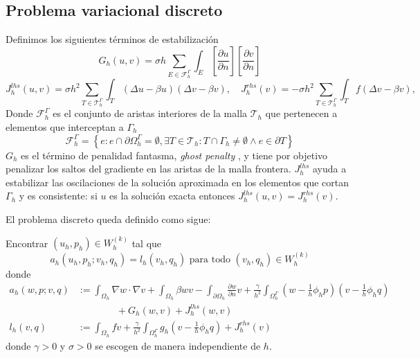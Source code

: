 \subsection{Problema variacional discreto}
Definimos los siguientes términos de estabilización
\begin{equation}
	G_h(u,v)= \sigma h \sum_{E\in \mathcal{F}_h^\Gamma} \int_E \left[ \frac{\partial u}{\partial n} \right]
	\left[ \frac{\partial v}{\partial n} \right]	
\end{equation}
\begin{equation}
	J_h^{lhs}(u,v)=\sigma h^2 \sum_{T\in \mathcal{T}_h^\Gamma} \int_T (\Delta u-\beta u) (\Delta  v-\beta v),\quad
	J_h^{rhs}(v)=-\sigma h^2 \sum_{T\in \mathcal{T}_h^\Gamma} \int_T f(\Delta  v-\beta v),\quad 
\end{equation}
Donde $\mathcal{F}_h^\Gamma$ es el conjunto de aristas interiores de la malla $\mathcal{T}_h$ que pertenecen a elementos que interceptan a $\Gamma_h$
\[
\mathcal{F}_h^\Gamma  = \left\{ e : e\cap \partial\Omega^\Gamma_h =\emptyset,  \exists T\in \mathcal{T}_h: T\cap \Gamma_h \neq \emptyset \wedge e\in \partial T \right\}
\]
$G_h$ es el término de penalidad fantasma, \textit{ghost penalty} \citep{burman2010ghost}, y tiene por objetivo penalizar los saltos del gradiente en las aristas de la malla frontera. $J_h^{lhs}$ ayuda a estabilizar las oscilaciones de la solución aproximada en los elementos que cortan $\Gamma_h$ y es consistente: si $u$ es la solución exacta entonces $J_h^{lhs}(u,v)=J_h^{rhs}(v)$.

El problema discreto queda definido como sigue: 

Encontrar $(u_h,p_h)\in W_h^{(k)}$ tal que
\begin{equation}
	a_h(u_h,p_h;v_h,q_h)=l_h(v_h,q_h)\text{ para todo } (v_h,q_h)\in W_h^{(k)}
	\label{eqn:phifemdual}
\end{equation}
donde
\begin{equation}
	\begin{aligned}	
		a_h(w,p;v,q)&:=	\int_{\Omega_h}\nabla w \cdot \nabla v
		+	\int_{\Omega_h}\beta w  v
		- \int_{\partial \Omega_h} \frac{\partial w}{\partial n}  v
		+ \frac{\gamma}{h^2}  \int_{\Omega_h^\Gamma} (w-\frac{1}{h}\phi_h p) (v-\frac{1}{h}\phi_h q)
		\\
		&\qquad\qquad +G_h(w,v)+J_h^{lhs}(w,v)\\ 
		l_h(v,q)&:= \int_{\Omega_h} fv + \frac{\gamma}{h^2}  \int_{\Omega_h^\Gamma} g_h (v-\frac{1}{h}\phi_h q)+J_h^{rhs}(v)
	\end{aligned}
\end{equation}
donde $\gamma>0$ y $\sigma>0$ se escogen de manera independiente de $h$.

